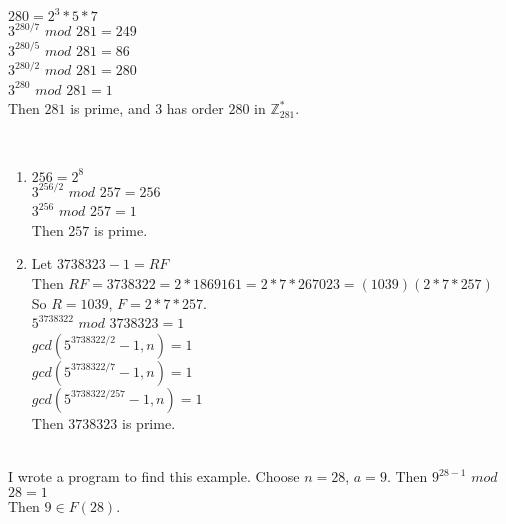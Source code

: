 \documentclass{assignment}
\begin{document}
\begin{problemlist}
\pbitem
\begin{problem}
\end{problem}
\begin{answer}
  \\
  $280=2^3*5*7$\\
  $3^{280/7}$ $mod$ $281=249$\\
  $3^{280/5}$ $mod$ $281=86$\\
  $3^{280/2}$ $mod$ $281=280$\\
  $3^{280}$ $mod$ $281=1$\\
  Then $281$ is prime, and $3$ has order $280$ in $\mathbb{Z}_281^*$.\\
\end{answer}

\pbitem
\begin{problem}
\end{problem}
\begin{answer}
  \\
  \begin{enumerate}
  \item
    $256=2^8$\\
    $3^{256/2}$ $mod$ $257 = 256$\\
    $3^{256}$ $mod$ $257 = 1$\\
    Then $257$ is prime.\\
  \item
    Let $3738323-1=RF$\\
    Then $RF=3738322=2*1869161=2*7*267023=(1039)(2*7*257)$\\
    So $R=1039$, $F=2*7*257$.\\
    $5^{3738322}$ $mod$ $3738323=1$\\
    $gcd(5^{3738322/2}-1,n)=1$\\
    $gcd(5^{3738322/7}-1,n)=1$\\
    $gcd(5^{3738322/257}-1,n)=1$\\
    Then $3738323$ is prime.\\
  \end{enumerate}
\end{answer}

\clearpage
\pbitem
\begin{problem}
\end{problem}
\begin{answer}
  \\
  I wrote a program to find this example.
  Choose $n=28$, $a=9$. Then $9^{28-1}$ $mod$ $28 = 1$\\
  Then $9\in F(28)$.\\
\end{answer}


\end{problemlist}
\end{document}
